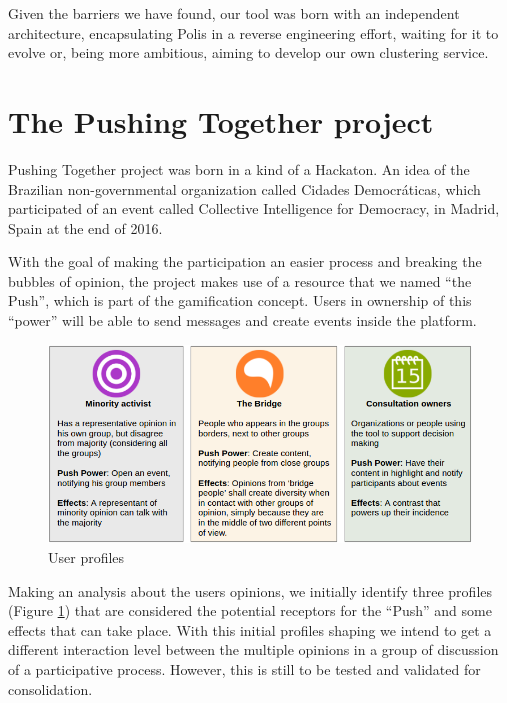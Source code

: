 \documentclass{llncs}
\begin{document}
  Given the barriers we have found, our tool was born with an independent
architecture, encapsulating Polis in a reverse engineering effort, waiting for
it to evolve or, being more ambitious, aiming to develop our own clustering
service.

\section{The Pushing Together project}
\label{sec:pushingtogether}

  Pushing Together project was born in a kind of a Hackaton. An idea of the
Brazilian non-governmental organization called Cidades Democráticas, which
participated of an event called Collective Intelligence for Democracy, in
Madrid, Spain at the end of 2016.

  With the goal of making the participation an easier process and breaking the
bubbles of opinion, the project makes use of a resource that we named ``the
Push'', which is part of the gamification concept. Users in ownership of this
``power'' will be able to send messages and create events inside the platform.

 \begin{figure}[hbt]
   \centering
     \includegraphics[keepaspectratio=true,scale=0.45]{images/userprofiles.png}
   \caption{User profiles}
   \label{fig:userprofiles}
 \end{figure}

  Making an analysis about the users opinions, we initially identify three
profiles (Figure \ref{fig:userprofiles}) that are considered the potential
receptors for the ``Push'' and some effects that can take place. With this
initial profiles shaping we intend to get a different interaction level between
the multiple opinions in a group of discussion of a participative process.
However, this is still to be tested and validated for consolidation.
\end{document}
